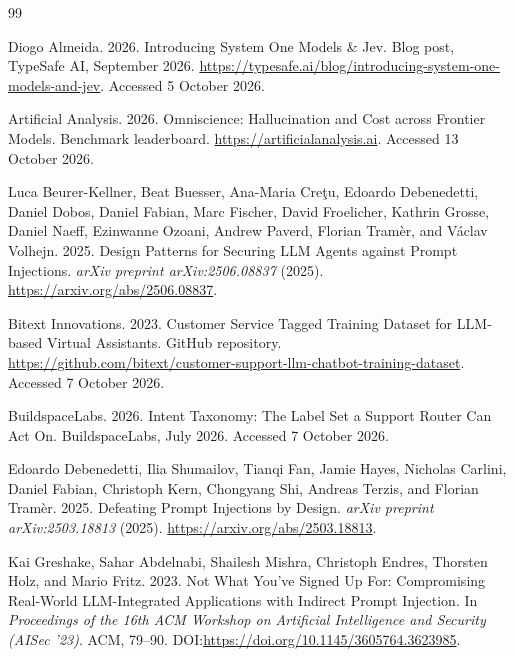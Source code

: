 \documentclass[sigconf,nonacm]{acmart}
\begin{document}
\begin{thebibliography}{99}

Diogo Almeida. 2026.
\newblock Introducing System One Models \& Jev.
\newblock Blog post, TypeSafe AI, September 2026. \url{https://typesafe.ai/blog/introducing-system-one-models-and-jev}. Accessed 5 October 2026.

Artificial Analysis. 2026.
\newblock Omniscience: Hallucination and Cost across Frontier Models.
\newblock Benchmark leaderboard. \url{https://artificialanalysis.ai}. Accessed 13 October 2026.

Luca Beurer-Kellner, Beat Buesser, Ana-Maria Cre\c{t}u, Edoardo Debenedetti, Daniel Dobos, Daniel Fabian, Marc Fischer, David Froelicher, Kathrin Grosse, Daniel Naeff, Ezinwanne Ozoani, Andrew Paverd, Florian Tram{\`e}r, and V{\'a}clav Volhejn. 2025.
\newblock Design Patterns for Securing {LLM} Agents against Prompt Injections.
\newblock \emph{arXiv preprint arXiv:2506.08837} (2025). \url{https://arxiv.org/abs/2506.08837}.

Bitext Innovations. 2023.
\newblock Customer Service Tagged Training Dataset for {LLM}-based Virtual Assistants.
\newblock GitHub repository. \url{https://github.com/bitext/customer-support-llm-chatbot-training-dataset}. Accessed 7 October 2026.

BuildspaceLabs. 2026.
\newblock Intent Taxonomy: The Label Set a Support Router Can Act On.
\newblock BuildspaceLabs, July 2026.
 Accessed 7 October 2026.

Edoardo Debenedetti, Ilia Shumailov, Tianqi Fan, Jamie Hayes, Nicholas Carlini, Daniel Fabian, Christoph Kern, Chongyang Shi, Andreas Terzis, and Florian Tram{\`e}r. 2025.
\newblock Defeating Prompt Injections by Design.
\newblock \emph{arXiv preprint arXiv:2503.18813} (2025). \url{https://arxiv.org/abs/2503.18813}.

Kai Greshake, Sahar Abdelnabi, Shailesh Mishra, Christoph Endres, Thorsten Holz, and Mario Fritz. 2023.
\newblock Not What You've Signed Up For: Compromising Real-World {LLM}-Integrated Applications with Indirect Prompt Injection.
\newblock In \emph{Proceedings of the 16th ACM Workshop on Artificial Intelligence and Security (AISec '23)}. ACM, 79--90. DOI:\url{https://doi.org/10.1145/3605764.3623985}.


\end{thebibliography}
\end{document}
